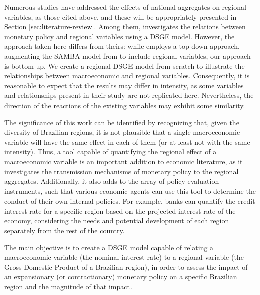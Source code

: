 \documentclass[../thesis.tex]{subfiles}
\begin{document}

Numerous studies have addressed the effects of national aggregates on regional variables, as those cited above, and these will be appropriately presented in Section \eqref{sec:literature-review}. Among them, \textcite{osterno_uma_2022} investigates the relations between monetary policy and regional variables using a DSGE model. However, the approach taken here differs from theirs: while \textcite{osterno_uma_2022} employs a top-down approach, augmenting the SAMBA model from \textcite{castro_samba_2015} to include regional variables, our approach is bottom-up. We create a regional DSGE model from scratch to illustrate the relationships between macroeconomic and regional variables. Consequently, it is reasonable to expect that the results may differ in intensity, as some variables and relationships present in their study are not replicated here. Nevertheless, the direction of the reactions of the existing variables may exhibit some similarity.

The significance of this work can be identified by recognizing that, given the diversity of Brazilian regions, it is not plausible that a single macroeconomic variable will have the same effect in each of them (or at least not with the same intensity). Thus, a tool capable of quantifying the regional effect of a macroeconomic variable is an important addition to economic literature, as it investigates the transmission mechanisms of monetary policy to the regional aggregates. Additionally, it also adds to the array of policy evaluation instruments, such that various economic agents can use this tool to determine the conduct of their own internal policies. For example, banks can quantify the credit interest rate for a specific region based on the projected interest rate of the economy, considering the needs and potential development of each region separately from the rest of the country.


The main objective is to create a DSGE model capable of relating a macroeconomic variable (the nominal interest rate) to a regional variable (the Gross Domestic Product of a Brazilian region), in order to assess the impact of an expansionary (or contractionary) monetary policy on a specific Brazilian region and the magnitude of that impact.
\end{document}
